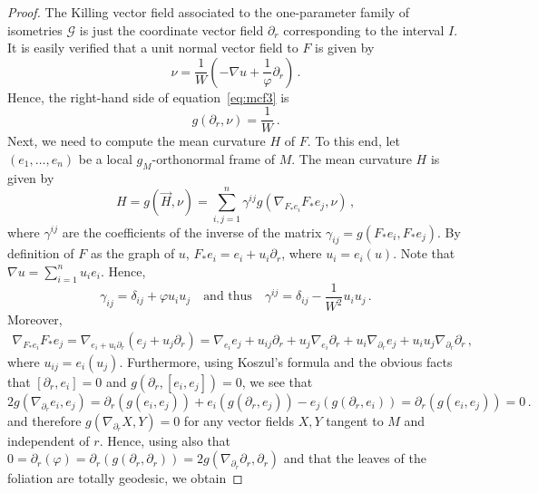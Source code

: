 \documentclass[10pt,a4paper]{amsart}
\begin{document}
\begin{proof}
The Killing vector field associated to the one-parameter family of isometries $\mathcal{G}$ is just the coordinate vector field $\partial_r$ corresponding to the interval $I$. It is easily verified that a unit normal vector field to $F$ is given by
\begin{equation*}
\nu = \frac{1}{W} \left( - \nabla u + \frac{1}{\varphi} \partial_r \right) \, .
\end{equation*}
Hence, the right-hand side of equation~\eqref{eq:mcf3} is
\begin{equation}\label{eq:Knu}
g \left( \partial_r , \nu \right) = \frac{1}{W} \, .
\end{equation}
Next, we need to compute the mean curvature $H$ of $F$. To this end, let $(e_1 , \dots , e_n)$ be a local $g_M$-orthonormal frame of $M$. The mean curvature $H$ is given by
\begin{equation*}
H = g \left( \vec{H} , \nu \right) = \sum_{i,j=1}^{n} \gamma^{ij} g \left( \nabla_{F_* e_i} F_* e_j , \nu \right) \, ,
\end{equation*}
where $\gamma^{ij}$ are the coefficients of the inverse of the matrix $\gamma_{ij} = g \left( F_* e_i , F_* e_j \right)$. By definition of $F$ as the graph of $u$, $F_* e_i = e_i + u_i \partial_r$, where $u_i = e_i(u)$. Note that $\nabla u = \sum_{i=1}^{n} u_i e_i$. Hence,
\begin{equation*}
    \gamma_{ij} = \delta_{ij} + \varphi u_i u_j \quad \text{and thus} \quad \gamma^{ij} = \delta_{ij} - \frac{1}{W^2} u_i u_j \, .
\end{equation*}
Moreover,
\begin{align*}
    \nabla_{F_* e_i} F_* e_j = \nabla_{e_i + u_i \partial_r} \left( e_j + u_j \partial_r \right) = \nabla_{e_i} e_j + u_{ij} \partial_r + u_j \nabla_{e_i} \partial_r + u_i \nabla_{\partial_r} e_j + u_i u_j \nabla_{\partial_r} \partial_r \, ,
\end{align*}
where $u_{ij} = e_i(u_j)$. Furthermore, using Koszul's formula and the obvious facts that $[\partial_r,e_i] = 0$ and $g(\partial_r,[e_i,e_j]) = 0$, we see that
\[
2g\left(\nabla_{\partial_r} e_i,e_j\right)
=\partial_r\left(g\left(e_i,e_j\right)\right)
+e_i(g\left(\partial_r,e_j\right))-e_j(g\left(\partial_r,e_i\right))
 =\partial_r\left( g\left(e_i,e_j\right)\right)=0 \, .
\]
and therefore $g(\nabla_{\partial_r} X,Y)=0$ for any vector fields $X,Y$ tangent to $M$ and independent of $r$. Hence, using also that $0 = \partial_r(\varphi) = \partial_r(g(\partial_r,\partial_r))=2g(\nabla_{\partial_r} \partial_r,\partial_r)$ and that the leaves of the foliation are totally geodesic, we obtain

\end{proof}
\end{document}
